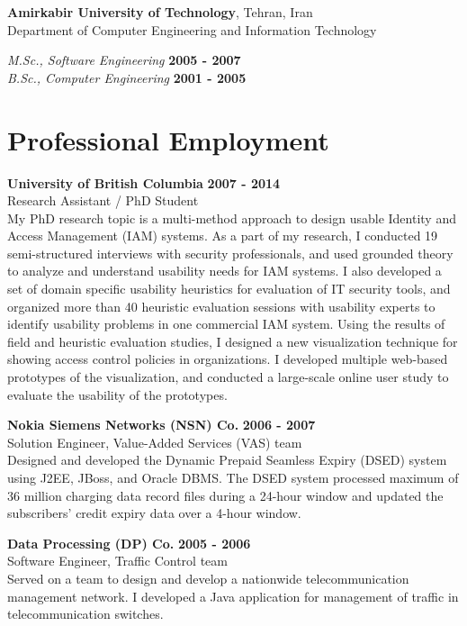 \documentclass[margin]{res}
\begin{document}
\begin{resume}
{\bf Amirkabir University of Technology}, Tehran, Iran\\
Department of Computer Engineering and Information Technology

\vspace{-.3cm}
{\em M.Sc., Software Engineering} \hfill {\bf 2005 - 2007}\\
{\em B.Sc., Computer Engineering} \hfill {\bf 2001 - 2005}\\

\section{\sc Professional Employment}
{\bf University of British Columbia} {\hfill} {\bf 2007 - 2014}\\
Research Assistant / PhD Student \\
My PhD research topic is a multi-method approach to design usable Identity and Access Management (IAM) systems. As a part of my research, I conducted 19 semi-structured interviews with security professionals, and used grounded theory to analyze and understand usability needs for IAM systems. I also developed a set of domain specific usability heuristics for evaluation of IT security tools, and organized more than 40 heuristic evaluation sessions with usability experts to identify usability problems in one commercial IAM system. Using the results of field and heuristic evaluation studies, I designed a new visualization technique for showing access control policies in organizations. I developed multiple web-based prototypes of the visualization, and conducted a large-scale online user study to evaluate the usability of the prototypes.

{\bf Nokia Siemens Networks (NSN)  Co.} {\hfill} {\bf 2006 - 2007}\\
Solution Engineer, Value-Added Services (VAS) team \\
Designed and developed the Dynamic Prepaid Seamless Expiry (DSED) system using J2EE, JBoss, and Oracle DBMS. The DSED system processed maximum of 36 million charging data record files during a 24-hour window and updated the subscribers' credit expiry data over a 4-hour window. 


{\bf Data Processing (DP) Co.} {\hfill} {\bf 2005 - 2006}\\
Software Engineer, Traffic Control team\\
Served on a team to design and develop a nationwide telecommunication management network. I developed a Java application for management of traffic in telecommunication switches. 


\end{resume}
\end{document}
